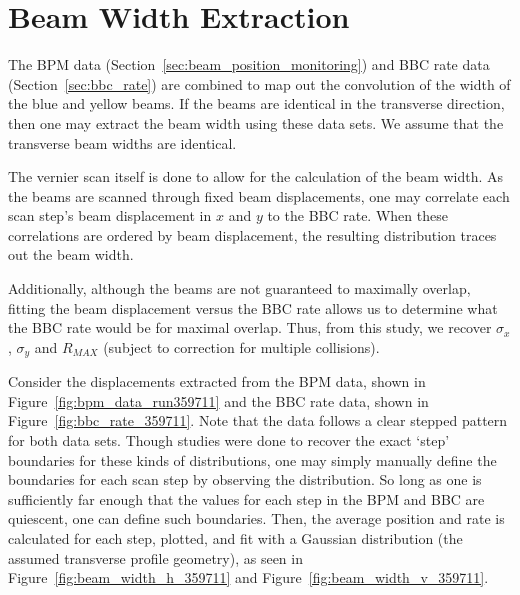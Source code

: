 \clearpage
\section{Beam Width Extraction}
\label{sec:beam_width}

The BPM data (Section~\ref{sec:beam_position_monitoring}) and BBC rate data
(Section~\ref{sec:bbc_rate}) are combined to map out the convolution of the
width of the blue and yellow beams. If the beams are identical in the transverse
direction, then one may extract the beam width using these data sets. We assume
that the transverse beam widths are identical.

The vernier scan itself is done to allow for the calculation of the beam width.
As the beams are scanned through fixed beam displacements, one may correlate
each scan step's beam displacement in $x$ and $y$ to the BBC rate. When these
correlations are ordered by beam displacement, the resulting distribution traces
out the beam width. 

Additionally, although the beams are not guaranteed to maximally overlap,
fitting the beam displacement versus the BBC rate allows us to determine what
the BBC rate would be for maximal overlap. Thus, from this study, we recover
$\sigma_{x}$, $\sigma_{y}$ and $R_{MAX}$ (subject to correction for multiple
collisions).

Consider the displacements extracted from the BPM data, shown in
Figure~\ref{fig:bpm_data_run359711} and the BBC rate data, shown in
Figure~\ref{fig:bbc_rate_359711}. Note that the data follows a clear stepped
pattern for both data sets. Though studies were done to recover the exact `step'
boundaries for these kinds of distributions, one may simply manually define the
boundaries for each scan step by observing the distribution. So long as one is
sufficiently far enough that the values for each step in the BPM and BBC are
quiescent, one can define such boundaries. Then, the average position and rate
is calculated for each step, plotted, and fit with a Gaussian distribution (the
assumed transverse profile geometry), as seen in
Figure~\ref{fig:beam_width_h_359711} and Figure~\ref{fig:beam_width_v_359711}.

